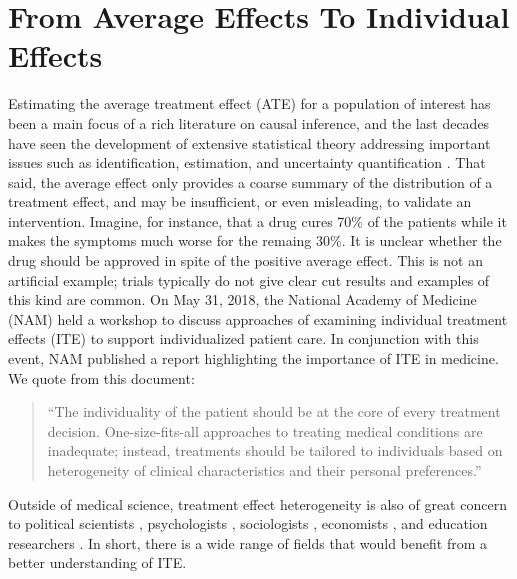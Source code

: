 \section{From Average Effects To Individual
  Effects}\label{sec:introduction}

Estimating the average treatment effect (ATE) for a population of
interest has been a main focus of a rich literature on causal
inference, and the last decades have seen the development of extensive
statistical theory addressing important issues such as identification,
estimation, and uncertainty quantification
\citep[e.g.][]{rubin1974estimating, pearl1995causal}. That said, the
average effect only provides a coarse summary of the distribution of a
treatment effect, and may be insufficient, or even misleading, to
validate an intervention. Imagine, for instance, that a drug cures
70\% of the patients while it makes the symptoms much worse for the remaing
30\%. It is unclear whether the drug should be approved in spite of the
positive average effect. This is not an artificial example; 
trials typically do not give clear cut results and examples of this kind are common.
On May 31, 2018, the National Academy of Medicine (NAM) held a
workshop to discuss approaches of examining individual treatment
effects (ITE) to support individualized patient care. In conjunction
with this event,  NAM published a report highlighting the importance
of ITE in medicine.  We quote from this document:
\begin{quote}
``The individuality of the patient should be at the core of every treatment decision. One-size-fits-all approaches to treating medical conditions are inadequate; instead, treatments should be tailored to individuals based on heterogeneity of clinical characteristics and their personal preferences.''
\end{quote}
Outside of medical science, treatment effect heterogeneity is also of
great concern to political scientists \citep{imai2011estimation,
  grimmer2017estimating}, psychologists \citep{bolger2019causal,
  winkelbeiner2019evaluation}, sociologists \citep{xie2012estimating,
  breen2015heterogeneous}, economists
\citep{florens2008identification, djebbari2008heterogeneous}, and
education researchers \citep{morgan2001counterfactuals,
  brand2010benefits}. In short, there is a wide range of fields that
would benefit from a better understanding of ITE. 

